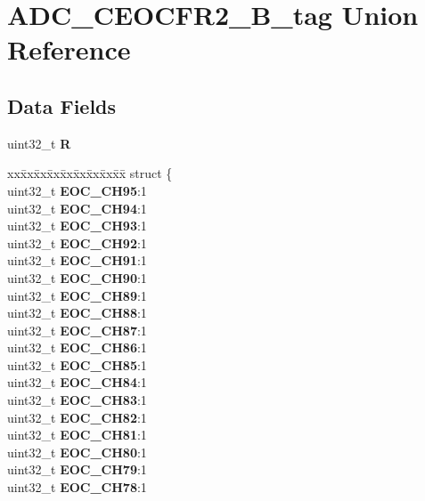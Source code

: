 \hypertarget{unionADC__CEOCFR2__32B__tag}{}\section{A\+D\+C\+\_\+\+C\+E\+O\+C\+F\+R2\+\_\+B\+\_\+tag Union Reference}
\label{unionADC__CEOCFR2__32B__tag}
\subsection*{Data Fields}
\begin{DoxyCompactItemize}
\item 
\mbox{\label{unionADC__CEOCFR2__32B__tag_a6bb7bcca12a4a8e443475e3909b0ea84}} 
uint32\+\_\+t {\bfseries R}
\item 
\mbox{\label{unionADC__CEOCFR2__32B__tag_a7b7db2c7cf0edf9c0ac3c2fb26716598}} 
\begin{tabbing}
xx\=xx\=xx\=xx\=xx\=xx\=xx\=xx\=xx\=\kill
struct \{\\
\>uint32\_t {\bfseries EOC\_CH95}:1\\
\>uint32\_t {\bfseries EOC\_CH94}:1\\
\>uint32\_t {\bfseries EOC\_CH93}:1\\
\>uint32\_t {\bfseries EOC\_CH92}:1\\
\>uint32\_t {\bfseries EOC\_CH91}:1\\
\>uint32\_t {\bfseries EOC\_CH90}:1\\
\>uint32\_t {\bfseries EOC\_CH89}:1\\
\>uint32\_t {\bfseries EOC\_CH88}:1\\
\>uint32\_t {\bfseries EOC\_CH87}:1\\
\>uint32\_t {\bfseries EOC\_CH86}:1\\
\>uint32\_t {\bfseries EOC\_CH85}:1\\
\>uint32\_t {\bfseries EOC\_CH84}:1\\
\>uint32\_t {\bfseries EOC\_CH83}:1\\
\>uint32\_t {\bfseries EOC\_CH82}:1\\
\>uint32\_t {\bfseries EOC\_CH81}:1\\
\>uint32\_t {\bfseries EOC\_CH80}:1\\
\>uint32\_t {\bfseries EOC\_CH79}:1\\
\>uint32\_t {\bfseries EOC\_CH78}:1\\

\end{tabbing}
\end{DoxyCompactItemize}
